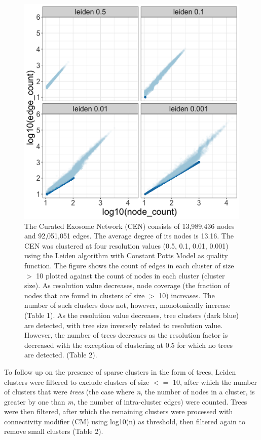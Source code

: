 \documentclass[12pt, oneside]{article}   	%
\begin{document}
\begin{figure}[H]
\centering
\includegraphics[width=0.7\linewidth]{cen_quad_fig1.png}
\caption{The Curated Exosome Network (CEN) consists of 13,989,436 nodes and 92,051,051 edges. The average degree of its nodes is 13.16. The CEN was clustered at four resolution values (0.5, 0.1, 0.01, 0.001) using the Leiden algorithm with Constant Potts Model as quality function. The figure shows the count of edges in each cluster of size $>$  10 plotted against the count of nodes in each cluster (cluster size). As resolution value decreases, node coverage (the fraction of nodes that are found in clusters of size $>$  10) increases. The number of such clusters does not, however, monotonically increase (Table 1). As the resolution value decreases, tree clusters (dark blue) are detected, with tree size inversely related to resolution value. However, the number of trees decreases as the resolution factor is decreased with the exception of clustering at 0.5 for which no trees are detected. (Table 2).}
\end{figure}

To follow up on the presence of sparse clusters in the form of trees, Leiden clusters were filtered to exclude clusters of size $<=$ 10, after which the number of clusters that were \emph{trees} (the case where \emph{n}, the number of nodes in a cluster, is greater by one than \emph{m}, the number of intra-cluster edges) were counted. Trees were then filtered, after which the remaining clusters were processed with connectivity modifier (CM) using log10(n) as threshold, then filtered again to remove small clusters (Table 2).

\end{document}
